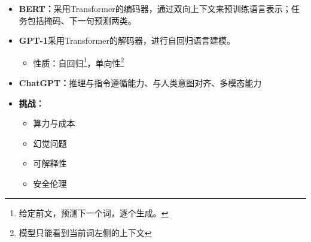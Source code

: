 \documentclass[../main.tex]{subfiles}
\begin{document}
\begin{itemize}
\begin{itemize}
\begin{itemize}
            \item \textbf{编码器-解码器架构（Encoder-Decoder）：}
            \begin{itemize}
                \item \textbf{编码器：}用于理解输入序列（如 BERT）；
                \item \textbf{解码器：}用于生成输出序列（如 GPT 系列）。
            \end{itemize}
        \end{itemize}
    \end{itemize}
    \item \textbf{BERT：}采用Transformer的编码器，通过双向上下文来预训练语言表示；任务包括掩码、下一句预测两类。
    \item \textbf{GPT-1}采用Transformer的解码器，进行自回归语言建模。
    \begin{itemize}
        \item 性质：自回归\footnote{给定前文，预测下一个词，逐个生成。}，单向性\footnote{模型只能看到当前词左侧的上下文}
    \end{itemize}
    \item \textbf{ChatGPT：}推理与指令遵循能力、与人类意图对齐、多模态能力
    \item \textbf{挑战：}
    \begin{itemize}
        \item 算力与成本
        \item 幻觉问题
        \item 可解释性
        \item 安全伦理
    \end{itemize}
\end{itemize}
\end{document}
